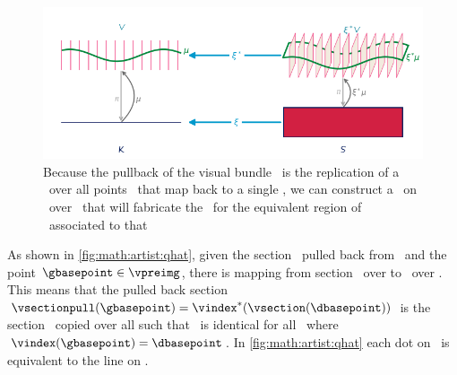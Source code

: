 \documentclass[../main.tex]{subfiles}
\begin{document}
\begin{figure}[H]
    \centering
      \includegraphics[width=1\textwidth]{figures/math/q_hat.png}
      \caption{Because the pullback of the visual bundle \vtotalpull\ is the replication of a \vsection\ over all points \gbasepoint\ that map back to a single \dbasepoint, we can construct a \vmarkd\ on \vsection\ over \dbasepoint\ that will fabricate the \vmark\ for the equivalent region of \gbasepoint\ associated to that \dbasepoint}
      \label{fig:math:artist:qhat}
  \end{figure}
  
As shown in \autoref{fig:math:artist:qhat}, given the section \vsectionpull\ pulled back from \vsection\ and the point $\gbasepoint \in \vpreimg$, there is mapping from section \vsectionpull\ over \gbasepoint to \vsection\ over \dbasepoint. This means that the pulled back section $\vsectionpull(\gbasepoint) = \vindex^*(\vsection(\dbasepoint))$ is the section \vsection\ copied over all \gbasepoint such that \vsectionpull\ is identical for all \gbasepoint\ where $\vindex(\gbasepoint) = \dbasepoint$. In \autoref{fig:math:artist:qhat} each dot on \vfiber\ is equivalent to the line on \vfiberpull. 
\end{document}
